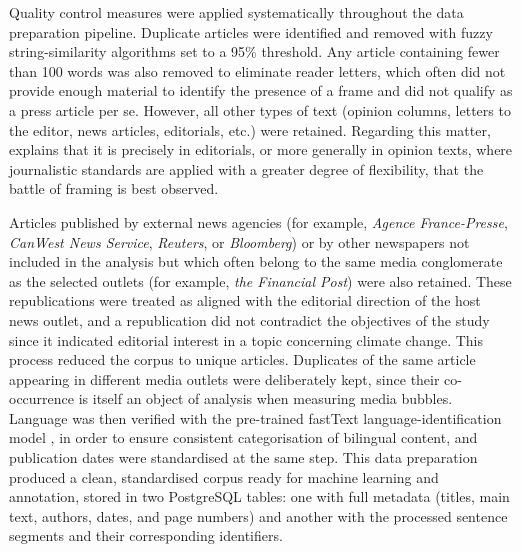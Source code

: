 \documentclass[12pt]{article}
\renewcommand\_{\texttt{\detokenize{_}\allowbreak}}
\begin{document}
Quality control measures were applied systematically throughout the data preparation pipeline. Duplicate articles were identified and removed with fuzzy string-similarity algorithms set to a 95\% threshold. Any article containing fewer than 100 words was also removed  to eliminate reader letters, which often did not provide enough material to identify the presence of a frame and did not qualify as a press article per se. However, all other types of text (opinion columns, letters to the editor, news articles, editorials, etc.) were retained. Regarding this matter, \textcite{lawrence_framing_2004} explains that it is precisely in editorials, or more generally in opinion texts, where journalistic standards are applied with a greater degree of flexibility, that the battle of framing is best observed.

Articles published by external news agencies (for example, \textit{Agence France-Presse}, \textit{CanWest News Service}, \textit{Reuters}, or \textit{Bloomberg}) or by other newspapers not included in the analysis but which often belong to the same media conglomerate as the selected outlets (for example, \textit{the Financial Post}) were also retained. These republications were treated as aligned with the editorial direction of the host news outlet, and a republication did not contradict the objectives of the study since it indicated editorial interest in a topic concerning climate change. This process reduced the corpus to \CCFarticles{} unique articles. Duplicates of the same article appearing in different media outlets were deliberately kept, since their co-occurrence is itself an object of analysis when measuring media bubbles. Language was then verified with the pre-trained fastText language-identification model \autocite{joulin_bag_2017, joulin_fasttext_2016}, in order to ensure consistent categorisation of bilingual content, and publication dates were standardised at the same step. This data preparation produced a clean, standardised corpus ready for machine learning and annotation, stored in two PostgreSQL tables: one with full metadata (titles, main text, authors, dates, and page numbers) and another with the processed sentence segments and their corresponding identifiers.
\end{document}
